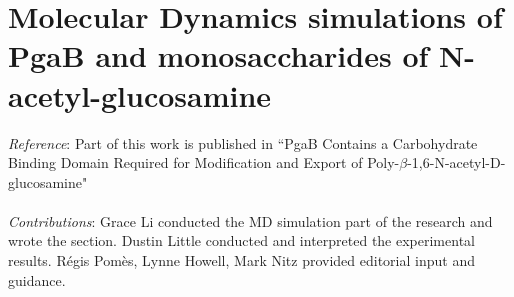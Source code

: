 % 


\chapter[MD simulations of PgaB-glucosamine binding]{Molecular Dynamics simulations of PgaB and monosaccharides of N-acetyl-glucosamine}

\emph{Reference}: Part of this work is published in ``PgaB Contains a Carbohydrate Binding Domain Required for Modification and Export of Poly-$\beta$-1,6-N-acetyl-D-glucosamine"
\\
\\
\emph{Contributions}:
Grace Li conducted the MD simulation part of the research and wrote the section. Dustin Little conducted and interpreted the experimental results. Régis Pomès, Lynne Howell, Mark Nitz provided editorial input and guidance.

\newpage

